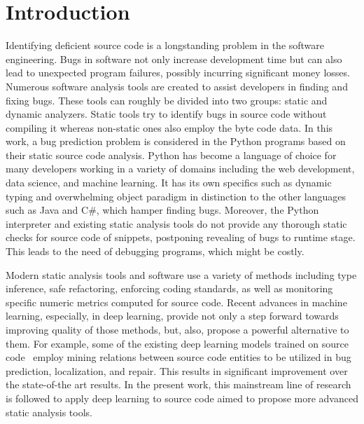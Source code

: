 \documentclass[10pt,conference]{IEEEtran}
\begin{document}
\section{Introduction}

Identifying deficient source code is a longstanding problem in the software engineering. Bugs in software not only increase development time but can also lead to unexpected program failures, possibly incurring
significant money losses. Numerous software analysis tools are created to assist developers in finding and fixing bugs. These tools can roughly be divided into two groups: static and dynamic analyzers. Static tools try to identify 
bugs in source code without compiling it whereas non-static ones also employ the byte code data. In this work, a bug prediction problem is considered in the Python programs based on their static source code analysis. 
Python has become a language of choice for many developers working in a variety of domains including the web development, data science, and machine learning.
It has its own specifics such as dynamic typing and overwhelming object paradigm in distinction to the other languages such as Java and C\#, which hamper finding bugs.
Moreover, the Python interpreter and existing static analysis tools do not provide any thorough static checks for source code of snippets, postponing revealing of bugs to runtime stage. This leads to the need of debugging
programs, which might be costly. 

Modern static analysis tools and software use a variety of methods including type inference, 
safe refactoring, enforcing coding standards, as well as monitoring specific numeric metrics computed for source code.
Recent advances in machine learning, especially, in deep learning, provide not only a step forward towards improving quality of those methods, but, also,
propose a powerful alternative to them.
For example, some of the existing deep learning models trained on source code~\cite{allamanis2021selfsupervised} employ mining relations between source code entities to be utilized
in bug prediction, localization, and repair. This results in significant improvement over the state-of-the art results.
In the present work, this mainstream line of research is followed to apply deep learning to source code aimed to propose more advanced static analysis tools.
\end{document}
